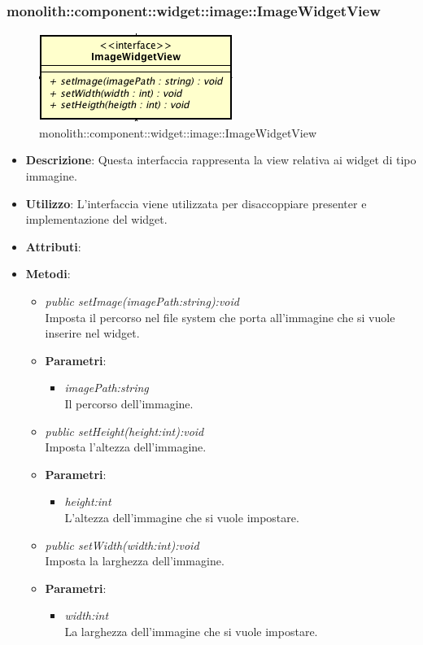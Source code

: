 \subsubsection{monolith::component::widget::image::ImageWidgetView}

\label{monolith::component::widget::image::ImageWidgetView}
\begin{figure}[ht]
	\centering
	\includegraphics[scale=0.5]{Sezioni/SottosezioniST/img/ImageWidgetView.png}
	\caption{monolith::component::widget::image::ImageWidgetView}
\end{figure}

\begin{itemize}
\item \textbf{Descrizione}: Questa interfaccia rappresenta la view relativa ai widget di tipo immagine.
\item \textbf{Utilizzo}: L'interfaccia viene utilizzata per disaccoppiare presenter e implementazione del widget.
\item \textbf{Attributi}:
\item \textbf{Metodi}:
	\begin{itemize}
	\item \textit{public setImage(imagePath:string):void}\\
	Imposta il percorso nel file system che porta all'immagine che si vuole inserire nel widget.
		\item{\textbf{Parametri}: \begin{itemize}
		\item \textit{imagePath:string}\\
		Il percorso dell'immagine.
		\end{itemize}}
	\item \textit{public setHeight(height:int):void}\\
	Imposta l'altezza dell'immagine.
		\item{\textbf{Parametri}: \begin{itemize}
		\item \textit{height:int}\\
		L'altezza dell'immagine che si vuole impostare.
		\end{itemize}}
	\item \textit{public setWidth(width:int):void}\\
	Imposta la larghezza dell'immagine.
		\item{\textbf{Parametri}: \begin{itemize}
		\item \textit{width:int}\\
		La larghezza dell'immagine che si vuole impostare.
		\end{itemize}}
	\end{itemize}
\end{itemize}


